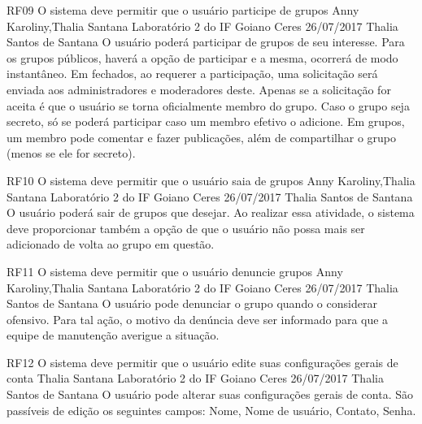  \requisitoFuncional
 {RF09}
 {O sistema deve permitir que o usuário participe de grupos}
 {Anny Karoliny,Thalia Santana}
 {Laboratório 2 do IF Goiano Ceres}
 {26/07/2017}
 {Thalia Santos de Santana}
 {O usuário poderá participar de grupos de seu interesse. Para os grupos públicos, haverá a opção de participar e a mesma,  ocorrerá de modo instantâneo. Em fechados, ao requerer a participação, uma solicitação será enviada aos administradores e moderadores deste. Apenas se a solicitação for aceita é que o usuário se torna oficialmente membro do grupo. Caso o grupo seja secreto, só se poderá participar caso um membro efetivo o adicione.  Em grupos, um membro pode comentar e fazer publicações, além de compartilhar o grupo (menos se ele for secreto).
 }
 
 \requisitoFuncional
 {RF10}
 {O sistema deve permitir que o usuário saia de grupos}
 {Anny Karoliny,Thalia Santana}
 {Laboratório 2 do IF Goiano Ceres}
 {26/07/2017}
 {Thalia Santos de Santana}
 {O usuário poderá sair de grupos que desejar. Ao realizar essa atividade, o sistema deve proporcionar também a opção de que o usuário não possa mais ser adicionado de volta ao grupo em questão.
 }
 
 \requisitoFuncional
 {RF11}
 {O sistema deve permitir que o usuário denuncie grupos}
 {Anny Karoliny,Thalia Santana}
 {Laboratório 2 do IF Goiano Ceres}
 {26/07/2017}
 {Thalia Santos de Santana}
 {O usuário pode denunciar o grupo quando o considerar ofensivo. Para tal ação, o motivo da denúncia deve ser informado para que a equipe de manutenção averigue a situação.
 }
 
 \requisitoFuncional
 {RF12}
 {O sistema deve permitir que o usuário edite suas configurações gerais de conta}
 {Thalia Santana}
 {Laboratório 2 do IF Goiano Ceres}
 {26/07/2017}
 {Thalia Santos de Santana}
 {O usuário pode alterar suas configurações gerais de conta. São passíveis de edição os seguintes campos: Nome, Nome de usuário, Contato,  Senha.
 }
 
